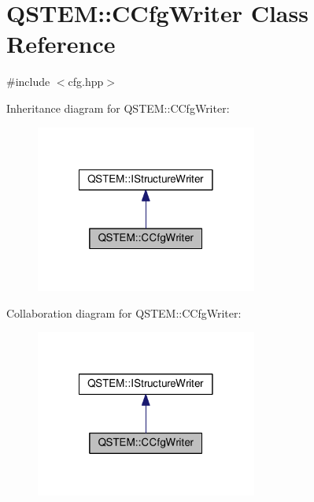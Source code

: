 \hypertarget{class_q_s_t_e_m_1_1_c_cfg_writer}{\section{Q\-S\-T\-E\-M\-:\-:C\-Cfg\-Writer Class Reference}
\label{class_q_s_t_e_m_1_1_c_cfg_writer}
}


{\ttfamily \#include $<$cfg.\-hpp$>$}



Inheritance diagram for Q\-S\-T\-E\-M\-:\-:C\-Cfg\-Writer\-:
\nopagebreak
\begin{figure}[H]
\begin{center}
\leavevmode
\includegraphics[width=206pt]{class_q_s_t_e_m_1_1_c_cfg_writer__inherit__graph}
\end{center}
\end{figure}


Collaboration diagram for Q\-S\-T\-E\-M\-:\-:C\-Cfg\-Writer\-:
\nopagebreak
\begin{figure}[H]
\begin{center}
\leavevmode
\includegraphics[width=206pt]{class_q_s_t_e_m_1_1_c_cfg_writer__coll__graph}
\end{center}
\end{figure}
